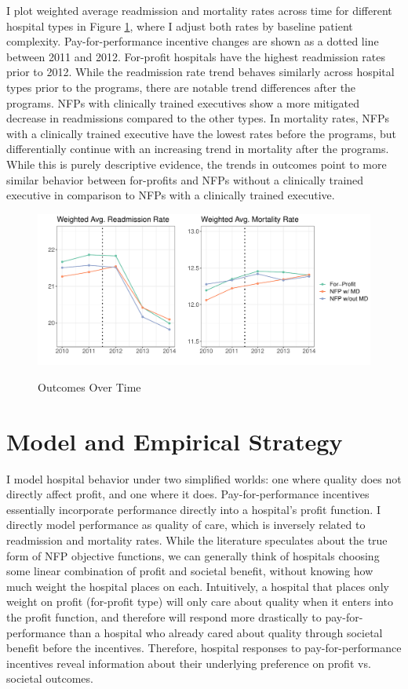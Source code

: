 \documentclass[12pt]{article}
\begin{document}
    I plot weighted average readmission and mortality rates across time for different hospital types in Figure \ref{fig:weighted_read_mort_graph}, where I adjust both rates by baseline patient complexity. Pay-for-performance incentive changes are shown as a dotted line between 2011 and 2012. For-profit hospitals have the highest readmission rates prior to 2012. While the readmission rate trend behaves similarly across hospital types prior to the programs, there are notable trend differences after the programs. NFPs with clinically trained executives show a more mitigated decrease in readmissions compared to the other types. In mortality rates, NFPs with a clinically trained executive have the lowest rates before the programs, but differentially continue with an increasing trend in mortality after the programs. While this is purely descriptive evidence, the trends in outcomes point to more similar behavior between for-profits and NFPs without a clinically trained executive in comparison to NFPs with a clinically trained executive.

    \begin{figure}[ht!]
    \centering
        \caption{Outcomes Over Time}
        \includegraphics[width=\textwidth]{Objects/weighted_read_mort_adjusted_graph.pdf}
        \label{fig:weighted_read_mort_graph}
    \end{figure}


    \section{Model and Empirical Strategy}\label{sec:model}

    I model hospital behavior under two simplified worlds: one where quality does not directly affect profit, and one where it does. Pay-for-performance incentives essentially incorporate performance directly into a hospital's profit function. I directly model performance as quality of care, which is inversely related to readmission and mortality rates. While the literature speculates about the true form of NFP objective functions, we can generally think of hospitals choosing some linear combination of profit and societal benefit, without knowing how much weight the hospital places on each. Intuitively, a hospital that places only weight on profit (for-profit type) will only care about quality when it enters into the profit function, and therefore will respond more drastically to pay-for-performance than a hospital who already cared about quality through societal benefit before the incentives. Therefore, hospital responses to pay-for-performance incentives reveal information about their underlying preference on profit vs. societal outcomes. 
\end{document}
